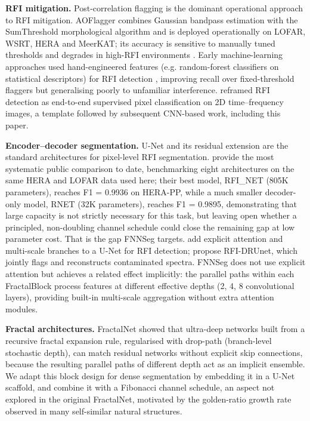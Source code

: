 \documentclass[11pt]{article}
\begin{document}
\textbf{RFI mitigation.} Post-correlation flagging is the dominant operational approach to RFI mitigation. AOFlagger \citep{offringa2012} combines Gaussian bandpass estimation with the SumThreshold morphological algorithm and is deployed operationally on LOFAR, WSRT, HERA and MeerKAT; its accuracy is sensitive to manually tuned thresholds and degrades in high-RFI environments \citep{offringa2010,baan2004}. Early machine-learning approaches used hand-engineered features (e.g. random-forest classifiers on statistical descriptors) for RFI detection \citep{mosiane2016}, improving recall over fixed-threshold flaggers but generalising poorly to unfamiliar interference. \citet{vafaeisadr2020} reframed RFI detection as end-to-end supervised pixel classification on 2D time--frequency images, a template followed by subsequent CNN-based work, including this paper.

\textbf{Encoder--decoder segmentation.} U-Net \citep{ronneberger2015} and its residual extension \citep{he2016} are the standard architectures for pixel-level RFI segmentation. \citet{dutoit2023} provide the most systematic public comparison to date, benchmarking eight architectures on the same HERA and LOFAR data used here; their best model, RFI\_NET (805K parameters), reaches F1 = 0.9936 on HERA-PP, while a much smaller decoder-only model, RNET (32K parameters), reaches F1 = 0.9895, demonstrating that large capacity is not strictly necessary for this task, but leaving open whether a principled, non-doubling channel schedule could close the remaining gap at low parameter cost. That is the gap FNNSeg targets. \citet{gu2024} add explicit attention and multi-scale branches to a U-Net for RFI detection; \citet{zhang2024} propose RFI-DRUnet, which jointly flags and reconstructs contaminated spectra. FNNSeg does not use explicit attention but achieves a related effect implicitly: the parallel paths within each FractalBlock process features at different effective depths (2, 4, 8 convolutional layers), providing built-in multi-scale aggregation without extra attention modules.

\textbf{Fractal architectures.} FractalNet \citep{larsson2017} showed that ultra-deep networks built from a recursive fractal expansion rule, regularised with drop-path (branch-level stochastic depth), can match residual networks without explicit skip connections, because the resulting parallel paths of different depth act as an implicit ensemble. We adapt this block design for dense segmentation by embedding it in a U-Net scaffold, and combine it with a Fibonacci channel schedule, an aspect not explored in the original FractalNet, motivated by the golden-ratio growth rate observed in many self-similar natural structures.
\end{document}
